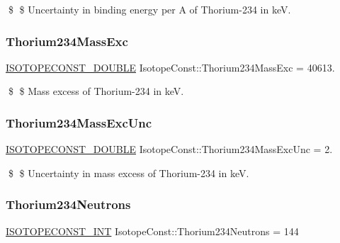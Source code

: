 \$ \$ Uncertainty in binding energy per A of Thorium-\/234 in keV. \mbox{\label{group___isotope_const-_thorium-_th234_gac9b02e09cac863ac8a577fe29e17ec35}} 
\subsubsection{\texorpdfstring{Thorium234\+Mass\+Exc}{Thorium234MassExc}}
{\footnotesize\ttfamily \mbox{\hyperlink{group___isotope_const-_macros_ga8f45a7272ce02c0b4c65c44636ed719a}{I\+S\+O\+T\+O\+P\+E\+C\+O\+N\+S\+T\+\_\+\+D\+O\+U\+B\+LE}} Isotope\+Const\+::\+Thorium234\+Mass\+Exc = 40613.}

\$ \$ Mass excess of Thorium-\/234 in keV. \mbox{\label{group___isotope_const-_thorium-_th234_ga8b648da6e13460527d4a976b888577e1}} 
\subsubsection{\texorpdfstring{Thorium234\+Mass\+Exc\+Unc}{Thorium234MassExcUnc}}
{\footnotesize\ttfamily \mbox{\hyperlink{group___isotope_const-_macros_ga8f45a7272ce02c0b4c65c44636ed719a}{I\+S\+O\+T\+O\+P\+E\+C\+O\+N\+S\+T\+\_\+\+D\+O\+U\+B\+LE}} Isotope\+Const\+::\+Thorium234\+Mass\+Exc\+Unc = 2.}

\$ \$ Uncertainty in mass excess of Thorium-\/234 in keV. \mbox{\label{group___isotope_const-_thorium-_th234_gae6bd3cc1ef327ddd56e5f9717150ecff}} 
\subsubsection{\texorpdfstring{Thorium234\+Neutrons}{Thorium234Neutrons}}
{\footnotesize\ttfamily \mbox{\hyperlink{group___isotope_const-_macros_ga5f18360b3e99483a35c32d789e62621c}{I\+S\+O\+T\+O\+P\+E\+C\+O\+N\+S\+T\+\_\+\+I\+NT}} Isotope\+Const\+::\+Thorium234\+Neutrons = 144}

